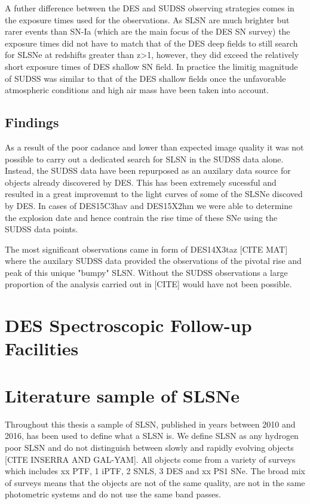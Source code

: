 A futher difference between the DES and SUDSS observing strategies comes in the exposure times used for the observations. As SLSN are much brighter but rarer events than SN-Ia (which are the main focus of the DES SN survey) the exposure times did not have to match that of the DES deep fields to still search for SLSNe at redshifts greater than z>1, however, they did exceed the relatively short exposure times of DES shallow SN field. In practice the limitig magnitude of SUDSS was similar to that of the DES shallow fields once the unfavorable atmospheric conditions and high air mass have been taken into account.

\subsection{Findings}
\label{sec:SUDSSIssues}
As a result of the poor cadance and lower than expected image quality it was not possible to carry out a dedicated search for SLSN in the SUDSS data alone. Instead, the SUDSS data have been repurposed as an auxilary data source for objects already discovered by DES. This has been extremely sucessful and resulted in a great improvemnt to the light curves of some of the SLSNe discoved by DES. In cases of DES15C3hav and DES15X2hm we were able to determine the explosion date and hence contrain the rise time of these SNe using the SUDSS data points.

The most significant observations came in form of DES14X3taz [CITE MAT] where the auxilary SUDSS data provided the observations of the pivotal rise and peak of this unique "bumpy" SLSN. Without the SUDSS observations a large proportion of the analysis carried out in [CITE] would have not been possible.

\section{DES Spectroscopic Follow-up Facilities}

\section{Literature sample of SLSNe}
Throughout this thesis a sample of SLSN, published in years between 2010 and 2016, has been used to define what a SLSN is. We define SLSN as any hydrogen poor SLSN and do not distinguish between slowly and rapidly evolving objects [CITE INSERRA AND GAL-YAM]. All objects come from a variety of surveys which includes xx PTF, 1 iPTF, 2 SNLS, 3 DES and xx PS1 SNe. The broad mix of surveys means that the objects are not of the same quality, are not in the same photometric systems and do not use the same band passes.

